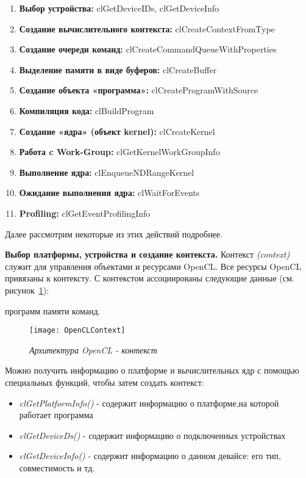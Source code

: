 {\begin{enumerate}
			\item\textbf{Выбор устройства:} clGetDeviceIDs, clGetDeviceInfo
			\item\textbf{Создание вычислительного контекста:} clCreateContextFromType
			\item\textbf{Создание очереди команд:} clCreateCommandQueueWithProperties
			\item\textbf{Выделение памяти в виде буферов:} clCreateBuffer
			\item\textbf{Создание объекта «программа»:} clCreateProgramWithSource
			\item\textbf{Компиляция кода:} clBuildProgram
			\item\textbf{Создание «ядра» (объект kernel):} clCreateKernel
			\item\textbf{Работа c Work-Group:} clGetKernelWorkGroupInfo 
			\item\textbf{Выполнение ядра:} clEnqueueNDRangeKernel 
			\item\textbf{Ожидание выполнения ядра:} clWaitForEvents 
			\item\textbf{Profiling:} clGetEventProfilingInfo
		\end{enumerate}
	Далее рассмотрим некоторые из этих действий подробнее.
	\par\textbf{Выбор платформы, устройства и создание контекста.} Контекст \textit{(context)} служит для управления объектами и ресурсами OpenCL. Все ресурсы OpenCL привязаны к контексту. С контекстом ассоциированы следующие данные (см. рисунок~\ref{OpenCLContext:image}):
		\begin{itemize}
			 программ
			 памяти
			 команд.
		\end{itemize}
	\begin{figure}[H]
		\texttt{[image: OpenCLContext]}
		\caption{\textit{Архитектура OpenCL - контекст}}
		\label{OpenCLContext:image}
	\end{figure}
	Можно получить информацию о платформе и вычислительных ядр с помощью специальных функций, чтобы затем создать контекст:
		\begin{itemize}
			\item\textit{clGetPlatformInfo()} - содержит информацию о платформе,на которой работает программа
			\item\textit{clGetDeviceDs()} - содержит информацию о подключенных устройствах
			\item\textit{clGetDeviceInfo()} - содержит информацию о данном девайсе: его тип, совместимость и тд.

\end{itemize}}
